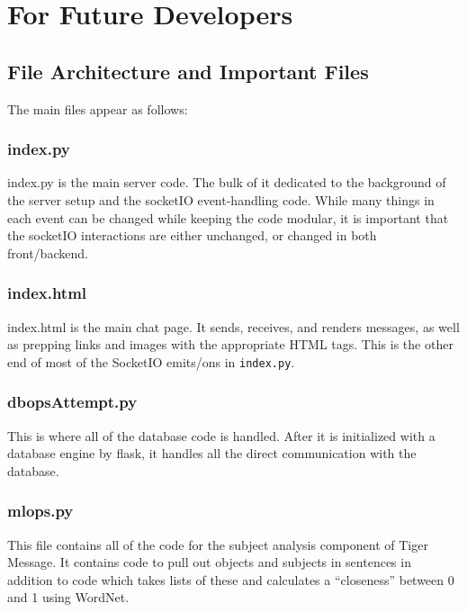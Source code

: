 \documentclass[12pt]{article}
\begin{document}
\section*{For Future Developers}

\subsection*{File Architecture and Important Files}

The main files appear as follows:


\subsubsection*{index.py}
index.py is the main server code. The bulk of it dedicated to the
background of the server setup and the socketIO event-handling code.
While many things in each event can be changed while keeping the
code modular, it is important that the socketIO interactions are
either unchanged, or changed in both front/backend.

\subsubsection*{index.html}
index.html is the main chat page. It sends, receives, and renders
messages, as well as prepping links and images with the appropriate
HTML tags. This is the other end of most of the SocketIO emits/ons
in \texttt{index.py}.

\subsubsection*{dbopsAttempt.py}
This is where all of the database code is handled. After it is
initialized with a database engine by flask, it handles all the
direct communication with the database.

\subsubsection*{mlops.py}
This file contains all of the code for the subject analysis
component of Tiger Message. It contains code to pull out objects and
subjects in sentences in addition to code which takes lists of these
and calculates a ``closeness'' between 0 and 1 using WordNet.
\end{document}
